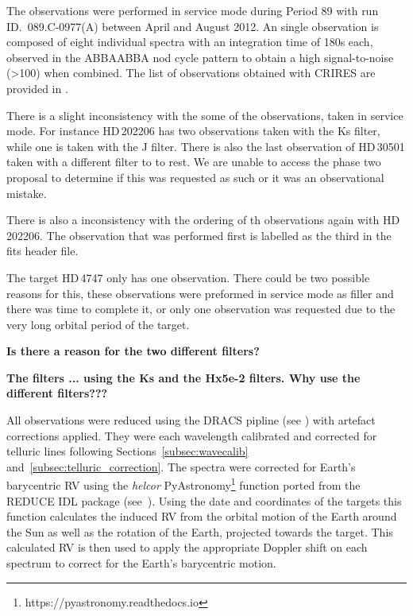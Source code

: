 The observations were performed in service mode during Period 89 with run {ID.~089.C-0977(A)} between April and August 2012. An single observation is composed of eight individual spectra with an integration time of 180\si{\second} each, observed in the {ABBAABBA} nod cycle pattern to obtain a high signal-to-noise (>100) when combined. The list of observations obtained with {CRIRES} are provided in .

There is a slight inconsistency with the some of the observations, taken in service mode. For instance {HD\,202206} has two observations taken with the {Ks} filter, while one is taken with the {J} filter. There is also the last observation of {HD\,30501} taken with a different filter to to rest. We are unable to access the phase two proposal to determine if this was requested as such or it was an observational mistake. 

There is also a inconsistency with the ordering of th observations again with {HD\,202206}. The observation that was performed first is labelled as the third in the fits header file.


The target {HD\,4747} only has one observation. There could be two possible reasons for this, these observations were preformed in service mode as filler and there was time to complete it, or only one observation was requested due to the very long orbital period of the target.

\textbf{Is there a reason for the two different filters?}





\textbf{The filters ... using the {Ks} and the {Hx5e-2} filters. Why use the different filters???}

All observations were reduced using the DRACS pipline (see ) with artefact corrections applied.
They were each wavelength calibrated and corrected for telluric lines following Sections~\ref{subsec:wavecalib} and~\ref{subsec:telluric_correction}.
The spectra were corrected for Earth's barycentric {RV} using the \emph{helcor} PyAstronomy\footnote{https://pyastronomy.readthedocs.io} function ported from the REDUCE IDL package (see~\citet[][]{piskunov_new_2002}). 
Using the date and coordinates of the targets this function calculates the induced RV from the orbital motion of the Earth around the Sun as well as the rotation of the Earth, projected towards the target.
This calculated RV is then used to apply the appropriate Doppler shift on each spectrum to correct for the Earth's barycentric motion.


